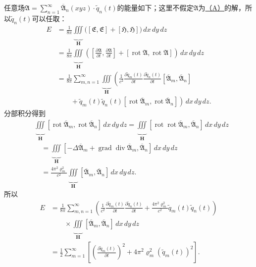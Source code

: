 \documentclass[fontsize=13pt,twoside,openany,headings=normal,parskip=false,bookmarkpackage=false,DIV=calc]{scrbook}
\begin{document}
任意场$\mathfrak A=\sum_{n=1}^{\infty}\overline{\mathfrak A}_n(xyz)\cdot\widetilde q_n(t)$的能量如下；这里不假定$\mathfrak A$为\CJKglue \hyperref[eq:III.6.A]{（A）}\CJKglue 的解，所以$\widetilde q_n(t)$可以任取：
\begin{align*}
 E&=\frac1{8\pi}\underbrace{\iiint}_{\boldsymbol H}
 \bigl([\mathfrak E,\mathfrak E]+[\mathfrak H,\mathfrak H]\bigr)\,dx\,dy\,dz\\
 &=\frac1{8\pi}\underbrace{\iiint}_{\boldsymbol H}
 \left(\left[\frac{\partial\mathfrak A}{\partial t},\frac{\partial\mathfrak A}{\partial t}\right]
 +[\operatorname{rot}\mathfrak A,\operatorname{rot}\mathfrak A]\right)\,dx\,dy\,dz\\
 &=\frac1{8\pi}\sum_{m,n=1}^{\infty}\underbrace{\iiint}_{\boldsymbol H}
 \left(\frac1{c^2}\frac{\partial\widetilde q_m(t)}{\partial t}
 \frac{\partial\widetilde q_n(t)}{\partial t}
 [\overline{\mathfrak A}_m,\overline{\mathfrak A}_n]\right.\\
 &\qquad\left.{}+\widetilde q_m(t)\widetilde q_n(t)
 [\operatorname{rot}\overline{\mathfrak A}_m,\operatorname{rot}\overline{\mathfrak A}_n]\right)\,dx\,dy\,dz.
\end{align*}
分部积分得到
\begin{align*}
 &\underbrace{\iiint}_{\boldsymbol H}[\operatorname{rot}\overline{\mathfrak A}_m,
 \operatorname{rot}\overline{\mathfrak A}_n]\,dx\,dy\,dz
 =\underbrace{\iiint}_{\boldsymbol H}[\operatorname{rot}\operatorname{rot}\overline{\mathfrak A}_m,
 \overline{\mathfrak A}_n]\,dx\,dy\,dz\\
 &\quad=\underbrace{\iiint}_{\boldsymbol H}[-\Delta\overline{\mathfrak A}_m
 +\operatorname{grad}\operatorname{div}\overline{\mathfrak A}_m,
 \overline{\mathfrak A}_n]\,dx\,dy\,dz\\
 &\quad=\frac{4\pi^2\varrho_m^2}{c^2}
 \underbrace{\iiint}_{\boldsymbol H}[\overline{\mathfrak A}_m,\overline{\mathfrak A}_n]\,dx\,dy\,dz.
\end{align*}
所以
\begin{align*}
 E&=\frac1{8\pi}\sum_{m,n=1}^{\infty}
 \left(\frac1{c^2}\frac{\partial\widetilde q_m(t)}{\partial t}
 \frac{\partial\widetilde q_n(t)}{\partial t}
 +\frac{4\pi^2\varrho_m^2}{c^2}\widetilde q_m(t)\widetilde q_n(t)\right)\\
 &\qquad{}\times\underbrace{\iiint}_{\boldsymbol H}
 [\overline{\mathfrak A}_m,\overline{\mathfrak A}_n]\,dx\,dy\,dz\\
 &=\frac12\sum_{m=1}^{\infty}
 \left[\left(\frac{\partial\widetilde q_m(t)}{\partial t}\right)^2
 +4\pi^2\varrho_m^2(\widetilde q_m(t))^2\right].
\end{align*}
\end{document}
